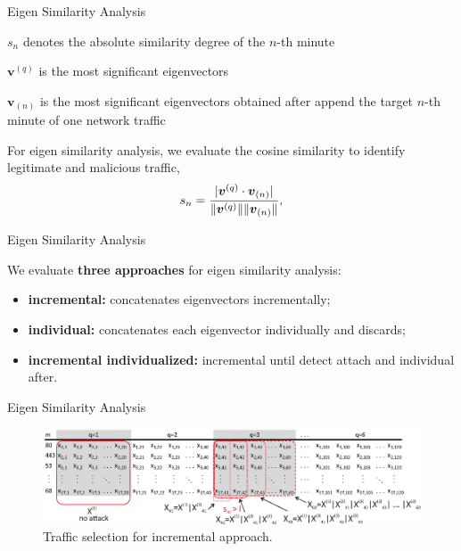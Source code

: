\documentclass[newPxFont, numfooter, sectionpages]{beamer}
\DeclarePairedDelimiter\abs{\lvert}{\rvert}%
\DeclarePairedDelimiter\norm{\lVert}{\rVert}%
\begin{document}
\begin{frame}{Eigen Similarity Analysis}
	
	$s_n$ denotes the absolute similarity degree of the $n$-th minute
	
	$\boldsymbol{v}^{(q)}$ is the most significant eigenvectors

	$\boldsymbol{v}_{(n)}$ is the most significant eigenvectors obtained after append the target $n$-th minute of one network traffic

	For eigen similarity analysis, we evaluate the cosine similarity to identify legitimate and malicious traffic,
	\begin{equation}
		\label{eq:eq11}
		s_n = \frac{\abs{\boldsymbol{v}^{(q)} \cdot \boldsymbol{v}_{(n)}}}{\norm{\boldsymbol{v}^{(q)}}\norm{\boldsymbol{v}_{(n)}}},
	\end{equation}

\end{frame}
\begin{frame}{Eigen Similarity Analysis}
	
	We evaluate \textbf{three approaches} for eigen similarity analysis: 
	\begin{itemize}
		\item \textbf{incremental:} concatenates eigenvectors incrementally;
		\item \textbf{individual:} concatenates each eigenvector individually and discards;
		\item \textbf{incremental individualized:} incremental until detect attach and individual after.
	\end{itemize}

\end{frame}
\begin{frame}{Eigen Similarity Analysis}
	
	\begin{figure}[h!]
		\centering
	    \includegraphics[width=11.5cm]{../figures/incremental.eps}
	    \caption{Traffic selection for incremental approach.}
	    \label{fig:2_fig8}
	\end{figure}

\end{frame}
\end{document}
